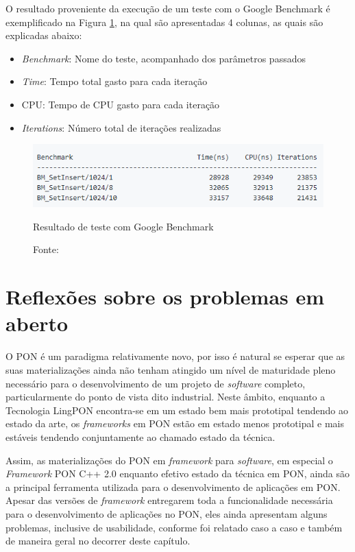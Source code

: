 O resultado proveniente da execução de um teste com o Google Benchmark é
exemplificado na Figura \ref{fig:google_bench_result}, na qual são apresentadas
4 colunas, as quais são explicadas abaixo:

\begin{itemize}
  \item \textit{Benchmark}: Nome do teste, acompanhado dos parâmetros passados
  \item \textit{Time}: Tempo total gasto para cada iteração
  \item CPU: Tempo de CPU gasto para cada iteração
  \item \textit{Iterations}: Número total de iterações realizadas
\end{itemize}

\begin{figure}[!htb]
  \centering
  \includegraphics[width=.8\textwidth]{../figures/google_bench_result.png}
  \caption{Resultado de teste com Google Benchmark}
  \caption*{Fonte: }
  \label{fig:google_bench_result}
\end{figure}

\section{Reflexões sobre os problemas em aberto}\label{sec:problemas}

O PON é um paradigma relativamente novo, por isso é natural se esperar que as
suas materializações ainda não tenham atingido um nível de maturidade pleno
necessário para o desenvolvimento de um projeto de \textit{software} completo,
particularmente do ponto de vista dito industrial. Neste âmbito, enquanto a
Tecnologia LingPON encontra-se em um estado bem mais prototipal tendendo ao
estado da arte, os \textit{frameworks} em PON estão em estado menos prototipal e
mais estáveis tendendo conjuntamente ao chamado estado da técnica. 

Assim, as materializações do PON em \textit{framework} para \textit{software},
em especial o \textit{Framework} PON C++ 2.0 enquanto efetivo estado da técnica
em PON, ainda são a principal ferramenta utilizada para o desenvolvimento de
aplicações em PON. Apesar das versões de \textit{framework} entregarem toda a
funcionalidade necessária para o desenvolvimento de aplicações no PON, eles
ainda apresentam alguns problemas, inclusive de usabilidade, conforme foi
relatado caso a caso e também de maneira geral no decorrer deste capítulo.

